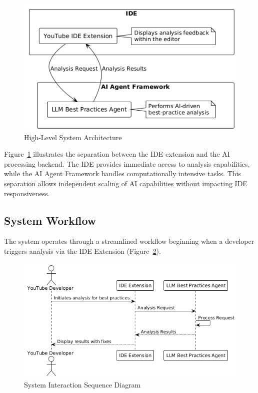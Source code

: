 \begin{spacing}{1.2}
\begin{figure}[H]
\centering
\includegraphics[scale=0.7]{images/high_level_system_architecture.png}
\caption{High-Level System Architecture}
\label{fig:system_architecture}
\end{figure}

Figure~\ref{fig:system_architecture} illustrates the separation between the IDE extension and the AI processing backend. The IDE provides immediate access to analysis capabilities, while the AI Agent Framework handles computationally intensive tasks. This separation allows independent scaling of AI capabilities without impacting IDE responsiveness.

\subsection{System Workflow}
The system operates through a streamlined workflow beginning when a developer triggers analysis via the IDE Extension (Figure~\ref{fig:sequence_diagram}).

\begin{figure}[H]
\centering
\includegraphics[scale=0.7]{images/sequence_diagram.png}
\caption{System Interaction Sequence Diagram}
\label{fig:sequence_diagram}
\end{figure}


\end{spacing}
